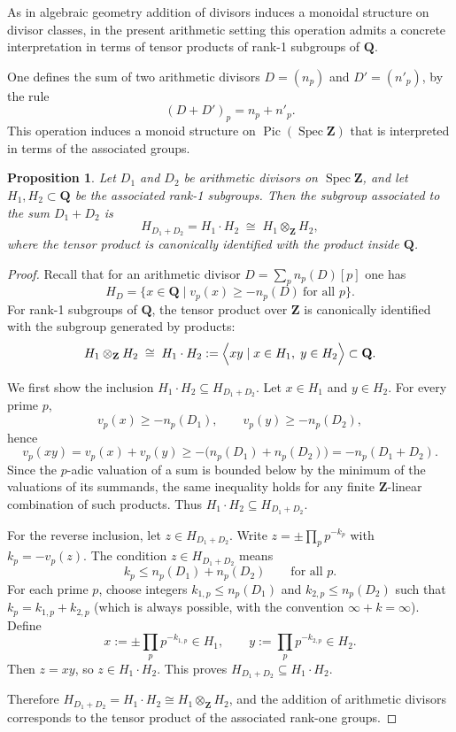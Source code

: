 \documentclass[11pt,a4paper]{article}
\newcommand{\Q}{\mathbf{Q}}
\newcommand{\Z}{\mathbf{Z}}
\def\spz{\Spec \Z}
\newcommand{\Spec}{\operatorname{Spec}}
\def\Pic{\operatorname{Pic}}
\def\spz{\Spec \Z}
\theoremstyle{plain}
\newtheorem{prop}[thm]{Proposition}
\theoremstyle{definition} %
\begin{document}
As in algebraic geometry addition of divisors induces a monoidal structure on divisor
classes, in the present arithmetic setting this operation admits a concrete
interpretation in terms of tensor products of rank-1 subgroups of $\Q$.

One defines the sum of two arithmetic divisors $D=(n_p)$ and $D'=(n'_p)$, by the rule 
$$
(D+D')_p=n_p+n'_p.
$$
This operation induces a monoid structure on $\Pic(\spz)$ that is interpreted in terms of the associated groups.

\begin{prop}
Let $D_1$ and $D_2$ be arithmetic divisors on $\spz$, and let
$H_1,H_2\subset\Q$ be the associated rank-1 subgroups.
Then the subgroup associated to the sum $D_1+D_2$ is
\[
H_{D_1+D_2}=H_1\cdot H_2 \;\cong\; H_1\otimes_{\Z} H_2,
\]
where the tensor product is canonically identified with the product inside $\Q$.
\end{prop}

\begin{proof}
Recall that for an arithmetic divisor $D=\sum_p n_p(D)[p]$ one has
\[
H_D=\{x\in\Q \mid v_p(x)\ge -n_p(D)\ \text{for all }p\}.
\]
For rank-1 subgroups of $\Q$, the tensor product over $\Z$ is canonically identified
with the subgroup generated by products:
\[
H_1\otimes_{\Z} H_2 \;\cong\; H_1\cdot H_2
:= \Bigl\langle xy \mid x\in H_1,\; y\in H_2 \Bigr\rangle \subset \Q.
\]

We first show the inclusion $H_1\cdot H_2 \subseteq H_{D_1+D_2}$.
Let $x\in H_1$ and $y\in H_2$. For every prime $p$,
\[
v_p(x)\ge -n_p(D_1), \qquad v_p(y)\ge -n_p(D_2),
\]
hence
\[
v_p(xy)=v_p(x)+v_p(y)\ge -\bigl(n_p(D_1)+n_p(D_2)\bigr)
= -n_p(D_1+D_2).
\]
Since the $p$-adic valuation of a sum is bounded below by the minimum of the valuations
of its summands, the same inequality holds for any finite $\Z$-linear combination of
such products. Thus $H_1\cdot H_2\subseteq H_{D_1+D_2}$.

For the reverse inclusion, let $z\in H_{D_1+D_2}$.
Write $z=\pm\prod_p p^{-k_p}$ with $k_p=-v_p(z)$.
The condition $z\in H_{D_1+D_2}$ means
\[
k_p \le n_p(D_1)+n_p(D_2)\qquad \text{for all }p.
\]
For each prime $p$, choose integers $k_{1,p}\le n_p(D_1)$ and
$k_{2,p}\le n_p(D_2)$ such that $k_p=k_{1,p}+k_{2,p}$
(which is always possible, with the convention $\infty+k=\infty$).
Define
\[
x:=\pm\prod_p p^{-k_{1,p}}\in H_1,
\qquad
y:=\prod_p p^{-k_{2,p}}\in H_2.
\]
Then $z=xy$, so $z\in H_1\cdot H_2$.
This proves $H_{D_1+D_2}\subseteq H_1\cdot H_2$.

Therefore $H_{D_1+D_2}=H_1\cdot H_2\cong H_1\otimes_{\Z} H_2$, and the addition of
arithmetic divisors corresponds to the tensor product of the associated rank-one
groups.
\end{proof}
\end{document}

